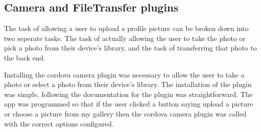 \subsection{Camera and FileTransfer plugins}
The task of allowing a user to upload a profile picture can be broken down into two seperate tasks. The task of actually allowing the user to take the photo or pick a photo from their device's library, and the task of transferring that photo to the back end. 

Installing the cordova camera plugin \cite{cc} was necessary to allow the user to take a photo or select a photo from their device's library. The installation of the plugin was simple, following the documentation for the plugin was straightforward. The app was programmed so that if the user clicked a button saying upload a picture or choose a picture from my gallery then the cordova camera plugin was called with the correct options configured.

